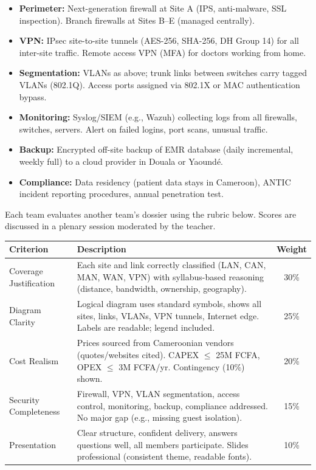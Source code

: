 \documentclass[11pt]{article}
\newcounter{popsec}
\newcounter{popsub}
\newcommand{\courssub}[1]{%
  \stepcounter{popsub}%
  \par\vspace{9pt}\noindent{\popxbold\fontsize{11.5}{13}\selectfont\color{popink}{\color{poporange}\thepopsec.\thepopsub}\hspace{6pt}#1}\par\nopagebreak\vspace{4pt}
}
\begin{document}
\begin{aretenir}
\begin{itemize}
    \item \textbf{Perimeter:} Next-generation firewall at Site A (IPS, anti-malware, SSL inspection). Branch firewalls at Sites B–E (managed centrally).
    \item \textbf{VPN:} IPsec site-to-site tunnels (AES-256, SHA-256, DH Group 14) for all inter-site traffic. Remote access VPN (MFA) for doctors working from home.
    \item \textbf{Segmentation:} VLANs as above; trunk links between switches carry tagged VLANs (802.1Q). Access ports assigned via 802.1X or MAC authentication bypass.
    \item \textbf{Monitoring:} Syslog/SIEM (e.g., Wazuh) collecting logs from all firewalls, switches, servers. Alert on failed logins, port scans, unusual traffic.
    \item \textbf{Backup:} Encrypted off-site backup of EMR database (daily incremental, weekly full) to a cloud provider in Douala or Yaoundé.
    \item \textbf{Compliance:} Data residency (patient data stays in Cameroon), ANTIC incident reporting procedures, annual penetration test.
\end{itemize}
\end{aretenir}

\courssub{Peer Review and Rubric}

Each team evaluates another team's dossier using the rubric below. Scores are discussed in a plenary session moderated by the teacher.

\begin{center}
\begin{tabularx}{\linewidth}{|l|X|c|}\hline
\textbf{Criterion} & \textbf{Description} & \textbf{Weight} \\ \hline
Coverage Justification & Each site and link correctly classified (LAN, CAN, MAN, WAN, VPN) with syllabus-based reasoning (distance, bandwidth, ownership, geography). & 30\% \\ \hline
Diagram Clarity & Logical diagram uses standard symbols, shows all sites, links, VLANs, VPN tunnels, Internet edge. Labels are readable; legend included. & 25\% \\ \hline
Cost Realism & Prices sourced from Cameroonian vendors (quotes/websites cited). CAPEX $\le$ 25M FCFA, OPEX $\le$ 3M FCFA/yr. Contingency (10\%) shown. & 20\% \\ \hline
Security Completeness & Firewall, VPN, VLAN segmentation, access control, monitoring, backup, compliance addressed. No major gap (e.g., missing guest isolation). & 15\% \\ \hline
Presentation & Clear structure, confident delivery, answers questions well, all members participate. Slides professional (consistent theme, readable fonts). & 10\% \\ \hline
\end{tabularx}
\end{center}
\end{document}
